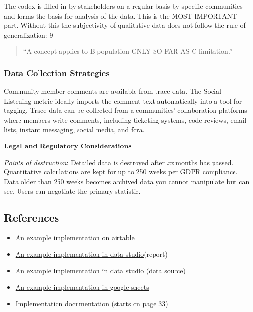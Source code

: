 The codex is filled in by stakeholders on a regular basis by specific
communities and forms the basis for analysis of the data. This is the
MOST IMPORTANT part. Without this the subjectivity of qualitative data
does not follow the rule of generalization: 9

\begin{quote}
``A concept applies to B population ONLY SO FAR AS C limitation.''
\end{quote}

\hypertarget{data-collection-strategies}{%
\subsubsection{Data Collection
Strategies}\label{data-collection-strategies}}

Community member comments are available from trace data. The Social
Listening metric ideally imports the comment text automatically into a
tool for tagging. Trace data can be collected from a communities'
collaboration platforms where members write comments, including
ticketing systems, code reviews, email lists, instant messaging, social
media, and fora.

\textbf{Legal and Regulatory Considerations}

\emph{Points of destruction}: Detailed data is destroyed after \emph{xx}
months has passed. Quantitative calculations are kept for up to 250
weeks per GDPR compliance. Data older than 250 weeks becomes archived
data you cannot manipulate but can see. Users can negotiate the primary
statistic.

\hypertarget{references}{%
\subsection{References}\label{references}}

\begin{itemize}
\tightlist
\item
  \href{https://airtable.com/invite/l?inviteId=inv8u49VVMtQTrfFU\&inviteToken=c49b1ed3759c5cd736901fd81c9f460f86e8e9f462703c4f85a3bdd7250ca5a7}{An
  example implementation on airtable}
\item
  \href{https://datastudio.google.com/open/1X9UdQz8FtHHmjMBpjba3pFqE55lNpwg5}{An
  example implementation in data studio}(report)
\item
  \href{https://datastudio.google.com/open/1Z4EJ03898lZxm2NZVULaEoLS0bYqL79A}{An
  example implementation in data studio} (data source)
\item
  \href{https://drive.google.com/open?id=1zi3JE0bwfEdRdc-wQEZn8GaB7sE8IvxeSeqvVywKnXw}{An
  example implementation in google sheets}
\item
  \href{https://docs.google.com/document/d/1RlAedRBQbhq0oYMCB3VqdawOCZE2XT5R3teydjBZODM/edit\#heading=h.8hyunaadfriq}{Implementation
  documentation} (starts on page 33)
\end{itemize}

